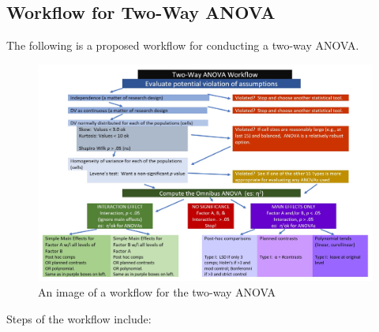 \documentclass[
  11pt,
]{book}
\begin{document}
\hypertarget{workflow-for-two-way-anova}{%
\subsection{Workflow for Two-Way ANOVA}\label{workflow-for-two-way-anova}}

The following is a proposed workflow for conducting a two-way ANOVA.

\begin{figure}
\centering
\includegraphics{images/factorial/TwoWayWrkFlo.jpg}
\caption{An image of a workflow for the two-way ANOVA}
\end{figure}

Steps of the workflow include:
\end{document}
